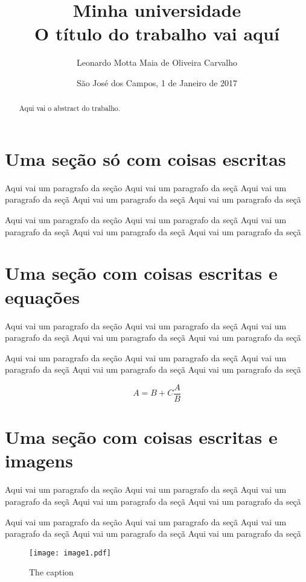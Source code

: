 \documentclass[12pt,twoside,a4paper]{article}
\title{
    {\vspace{0mm} Minha universidade}\\
    {\vspace{70mm} \textbf{O título do trabalho vai aquí}} \\
}
\author{Leonardo Motta Maia de Oliveira Carvalho}
\date{\vfill São José dos Campos, 1 de Janeiro de 2017}
\numberwithin{equation}{section}
\begin{document}
\maketitle
\newpage
\tableofcontents


\newpage
\begin{abstract}
    Aqui vai o abstract do trabalho.
\end{abstract}

\newpage

\section{Uma seção só com coisas escritas}
Aqui vai um paragrafo da seção Aqui vai um paragrafo da seçã Aqui vai um paragrafo da seçã Aqui vai um paragrafo da seçã Aqui vai um paragrafo da seçã

Aqui vai um paragrafo da seção Aqui vai um paragrafo da seçã Aqui vai um paragrafo da seçã Aqui vai um paragrafo da seçã Aqui vai um paragrafo da seçã

\section{Uma seção com coisas escritas e equações}
Aqui vai um paragrafo da seção Aqui vai um paragrafo da seçã Aqui vai um paragrafo da seçã Aqui vai um paragrafo da seçã Aqui vai um paragrafo da seçã

Aqui vai um paragrafo da seção Aqui vai um paragrafo da seçã Aqui vai um paragrafo da seçã Aqui vai um paragrafo da seçã Aqui vai um paragrafo da seçã

\begin{equation}
    A= B+C \frac{A}{B}
\end{equation}


\section{Uma seção com coisas escritas e imagens}
Aqui vai um paragrafo da seção Aqui vai um paragrafo da seçã Aqui vai um paragrafo da seçã Aqui vai um paragrafo da seçã Aqui vai um paragrafo da seçã

Aqui vai um paragrafo da seção Aqui vai um paragrafo da seçã Aqui vai um paragrafo da seçã Aqui vai um paragrafo da seçã Aqui vai um paragrafo da seçã


    \begin{figure}[htb]
        \centering
        \texttt{[image: image1.pdf]}
        \caption{The caption}
        \label{Image}
    \end{figure}
\end{document}
